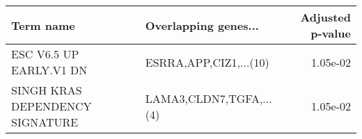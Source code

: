 \begin{tabular}{llr}
\toprule
                       Term name &    Overlapping genes... &  Adjusted p-value \\
\midrule
         ESC V6.5 UP EARLY.V1 DN &  ESRRA,APP,CIZ1,...(10) &          1.05e-02 \\
SINGH KRAS DEPENDENCY SIGNATURE  & LAMA3,CLDN7,TGFA,...(4) &          1.05e-02 \\
\bottomrule
\end{tabular}
